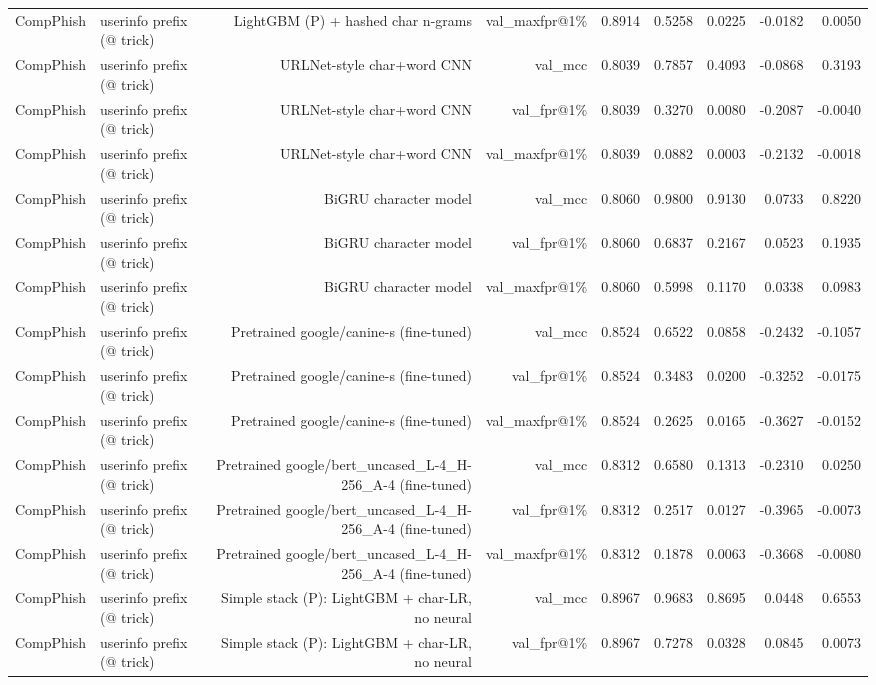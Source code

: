 \begin{table}[t]
\begin{tabular}{llrrrrrrr}
CompPhish & userinfo prefix (@ trick) & LightGBM (P) + hashed char n-grams & val\_maxfpr@1\% & 0.8914 & 0.5258 & 0.0225 & -0.0182 & 0.0050 \\
CompPhish & userinfo prefix (@ trick) & URLNet-style char+word CNN & val\_mcc & 0.8039 & 0.7857 & 0.4093 & -0.0868 & 0.3193 \\
CompPhish & userinfo prefix (@ trick) & URLNet-style char+word CNN & val\_fpr@1\% & 0.8039 & 0.3270 & 0.0080 & -0.2087 & -0.0040 \\
CompPhish & userinfo prefix (@ trick) & URLNet-style char+word CNN & val\_maxfpr@1\% & 0.8039 & 0.0882 & 0.0003 & -0.2132 & -0.0018 \\
CompPhish & userinfo prefix (@ trick) & BiGRU character model & val\_mcc & 0.8060 & 0.9800 & 0.9130 & 0.0733 & 0.8220 \\
CompPhish & userinfo prefix (@ trick) & BiGRU character model & val\_fpr@1\% & 0.8060 & 0.6837 & 0.2167 & 0.0523 & 0.1935 \\
CompPhish & userinfo prefix (@ trick) & BiGRU character model & val\_maxfpr@1\% & 0.8060 & 0.5998 & 0.1170 & 0.0338 & 0.0983 \\
CompPhish & userinfo prefix (@ trick) & Pretrained google/canine-s (fine-tuned) & val\_mcc & 0.8524 & 0.6522 & 0.0858 & -0.2432 & -0.1057 \\
CompPhish & userinfo prefix (@ trick) & Pretrained google/canine-s (fine-tuned) & val\_fpr@1\% & 0.8524 & 0.3483 & 0.0200 & -0.3252 & -0.0175 \\
CompPhish & userinfo prefix (@ trick) & Pretrained google/canine-s (fine-tuned) & val\_maxfpr@1\% & 0.8524 & 0.2625 & 0.0165 & -0.3627 & -0.0152 \\
CompPhish & userinfo prefix (@ trick) & Pretrained google/bert\_uncased\_L-4\_H-256\_A-4 (fine-tuned) & val\_mcc & 0.8312 & 0.6580 & 0.1313 & -0.2310 & 0.0250 \\
CompPhish & userinfo prefix (@ trick) & Pretrained google/bert\_uncased\_L-4\_H-256\_A-4 (fine-tuned) & val\_fpr@1\% & 0.8312 & 0.2517 & 0.0127 & -0.3965 & -0.0073 \\
CompPhish & userinfo prefix (@ trick) & Pretrained google/bert\_uncased\_L-4\_H-256\_A-4 (fine-tuned) & val\_maxfpr@1\% & 0.8312 & 0.1878 & 0.0063 & -0.3668 & -0.0080 \\
CompPhish & userinfo prefix (@ trick) & Simple stack (P): LightGBM + char-LR, no neural & val\_mcc & 0.8967 & 0.9683 & 0.8695 & 0.0448 & 0.6553 \\
CompPhish & userinfo prefix (@ trick) & Simple stack (P): LightGBM + char-LR, no neural & val\_fpr@1\% & 0.8967 & 0.7278 & 0.0328 & 0.0845 & 0.0073 \\

\end{tabular}
\end{table}
